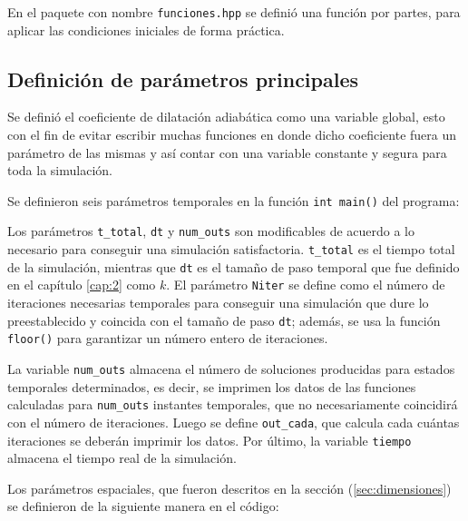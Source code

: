 En el paquete con nombre \texttt{funciones.hpp} se definió una función por partes, para aplicar las condiciones iniciales de forma práctica.



\subsection{Definición de parámetros principales}
Se definió el coeficiente de dilatación adiabática como una variable global, esto con el fin de evitar escribir muchas funciones en donde dicho coeficiente fuera un parámetro de las mismas y así contar con una variable constante y segura para toda la simulación.



Se definieron seis parámetros temporales en la función \texttt{int main()} del programa:


Los parámetros \texttt{t\_total}, \texttt{dt} y \texttt{num\_outs} son modificables de acuerdo a lo necesario para conseguir una simulación satisfactoria. \texttt{t\_total} es el tiempo total de la simulación, mientras que \texttt{dt} es el tamaño de paso temporal que fue definido en el capítulo \ref{cap:2} como $k$. El parámetro \texttt{Niter} se define como el número de iteraciones necesarias temporales para conseguir una simulación que dure lo preestablecido y coincida con el tamaño de paso \texttt{dt}; además, se usa la función \texttt{floor()} para garantizar un número entero de iteraciones. 

La variable \texttt{num\_outs} almacena el número de soluciones producidas para estados temporales determinados, es decir, se imprimen los datos de las funciones calculadas para \texttt{num\_outs} instantes temporales, que no necesariamente coincidirá con el número de iteraciones. Luego se define \texttt{out\_cada}, que calcula cada cuántas iteraciones se deberán imprimir los datos. Por último, la variable \texttt{tiempo} almacena el tiempo real de la simulación.

Los parámetros espaciales, que fueron descritos en la sección (\ref{sec:dimensiones}) se definieron de la siguiente manera en el código:


